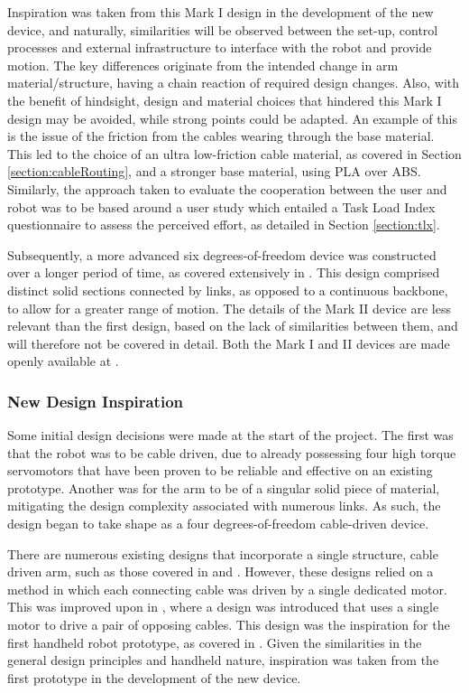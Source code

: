 \documentclass[11pt]{article}
\begin{document}
Inspiration was taken from this Mark I design in the development of the new device, and naturally, similarities will be observed between the set-up, control processes and external infrastructure to interface with the robot and provide motion. The key differences originate from the intended change in arm material/structure, having a chain reaction of required design changes. Also, with the benefit of hindsight, design and material choices that hindered this Mark I design may be avoided, while strong points could be adapted. An example of this is the issue of the friction from the cables wearing through the base material. This led to the choice of an ultra low-friction cable material, as covered in Section \ref{section:cableRouting}, and a stronger base material, using PLA over ABS. Similarly, the approach taken to evaluate the cooperation between the user and robot was to be based around a user study which entailed a Task Load Index questionnaire to assess the perceived effort, as detailed in Section \ref{section:tlx}.

Subsequently, a more advanced six degrees-of-freedom device was constructed over a longer period of time, as covered extensively in \cite{GreggSmithKinematics}. This design comprised distinct solid sections connected by links, as opposed to a continuous backbone, to allow for a greater range of motion. The details of the Mark II device are less relevant than the first design, based on the lack of similarities between them, and will therefore not be covered in detail. Both the Mark I and II devices are made openly available at \cite{handheldrobotics}.

\subsubsection{New Design Inspiration}
\label{section:newDesignInspiration}
Some initial design decisions were made at the start of the project. The first was that the robot was to be cable driven, due to already possessing four high torque servomotors that have been proven to be reliable and effective on an existing prototype. Another was for the arm to be of a singular solid piece of material, mitigating the design complexity associated with numerous links. As such, the design began to take shape as a four degrees-of-freedom cable-driven device. 

There are numerous existing designs that incorporate a single structure, cable driven arm, such as those covered in \cite{godage2011} and \cite{zhang2011}. However, these designs relied on a method in which each connecting cable was driven by a single dedicated motor. This was improved upon in \cite{yoon2009}, where a design was introduced that uses a single motor to drive a pair of opposing cables. This design was the inspiration for the first handheld robot prototype, as covered in \cite{GreggSmithDesign}. Given the similarities in the general design principles and handheld nature, inspiration was taken from the first prototype in the development of the new device.
\end{document}
